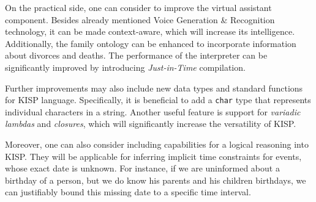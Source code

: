 On the practical side, one can consider to improve the virtual assistant component. Besides already mentioned Voice Generation \&
Recognition technology, it can be made context-aware, which will increase its intelligence. Additionally, the family ontology can
be enhanced to incorporate information about divorces and deaths. The performance of the interpreter can be significantly improved
by introducing \textit{Just-in-Time} compilation.

Further improvements may also include new data types and standard functions for KISP language. Specifically, it is beneficial to
add a \texttt{char} type that represents individual characters in a string. Another useful feature is support for \textit{variadic
lambdas} and \textit{closures}, which will significantly increase the versatility of KISP.

Moreover, one can also consider including capabilities for a logical reasoning into KISP. They will be applicable for inferring
implicit time constraints for events, whose exact date is unknown. For instance, if we are uninformed about a birthday of a
person, but we do know his parents and his children birthdays, we can justifiably bound this missing date to a specific time
interval.
